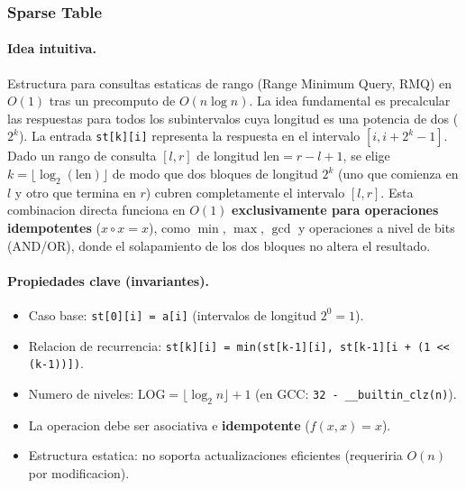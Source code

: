 \subsubsection{Sparse Table}

\paragraph{Idea intuitiva.}
Estructura para consultas estaticas de rango (Range Minimum Query, RMQ) en $O(1)$ tras un precomputo de $O(n \log n)$. La idea fundamental es precalcular las respuestas para todos los subintervalos cuya longitud es una potencia de dos ($2^k$). La entrada \texttt{st[k][i]} representa la respuesta en el intervalo $[i, i + 2^k - 1]$. Dado un rango de consulta $[l, r]$ de longitud $\text{len} = r - l + 1$, se elige $k = \lfloor \log_2(\text{len}) \rfloor$ de modo que dos bloques de longitud $2^k$ (uno que comienza en $l$ y otro que termina en $r$) cubren completamente el intervalo $[l, r]$. Esta combinacion directa funciona en $O(1)$ \textbf{exclusivamente para operaciones idempotentes} ($x \circ x = x$), como $\min$, $\max$, $\gcd$ y operaciones a nivel de bits (AND/OR), donde el solapamiento de los dos bloques no altera el resultado.

\paragraph{Propiedades clave (invariantes).}
\begin{itemize}\setlength\itemsep{0pt}
	\item Caso base: \texttt{st[0][i] = a[i]} (intervalos de longitud $2^0 = 1$).
	\item Relacion de recurrencia: \texttt{st[k][i] = min(st[k-1][i], st[k-1][i + (1 << (k-1))])}.
	\item Numero de niveles: $\text{LOG} = \lfloor \log_2 n \rfloor + 1$ (en GCC: \verb|32 - __builtin_clz(n)|).
	\item La operacion debe ser asociativa e \textbf{idempotente} ($f(x, x) = x$).
	\item Estructura estatica: no soporta actualizaciones eficientes (requeriria $O(n)$ por modificacion).
\end{itemize}

